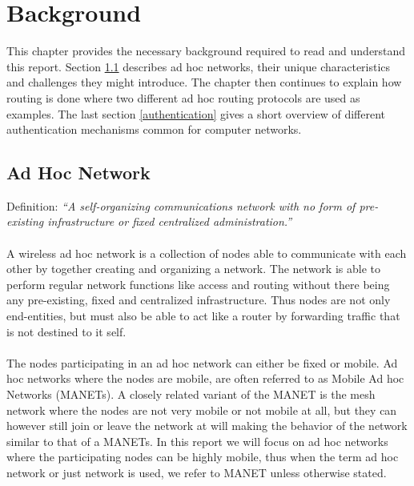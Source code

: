 \chapter{Background}
\label{background}
This chapter provides the necessary background required to read and understand this report. Section \ref{ad_hoc_network} describes ad hoc networks, their unique characteristics and challenges they might introduce. The chapter then continues to explain how routing is done where two different ad hoc routing protocols are used as examples. The last section \ref{authentication} gives a short overview of different authentication mechanisms common for computer networks.



\section{Ad Hoc Network}
\label{ad_hoc_network} 
Definition: \textit{``A self-organizing communications network with no form of pre-existing infrastructure or fixed centralized administration.''}
\\\\
A wireless ad hoc network is a collection of nodes able to communicate with each other by together creating and organizing a network. The network is able to perform regular network functions like access and routing without there being any pre-existing, fixed and centralized infrastructure. Thus nodes are not only end-entities, but must also be able to act like a router by forwarding traffic that is not destined to it self. %
\\\\
The nodes participating in an ad hoc network can either be fixed or mobile. Ad hoc networks where the nodes are mobile, are often referred to as Mobile Ad hoc Networks (MANETs). A closely related variant of the MANET is the mesh network where the nodes are not very mobile or not mobile at all, but they can however still join or leave the network at will making the behavior of the network similar to that of a MANETs. In this report we will focus on ad hoc networks where the participating nodes can be highly mobile, thus when the term ad hoc network or just network is used, we refer to MANET unless otherwise stated.

